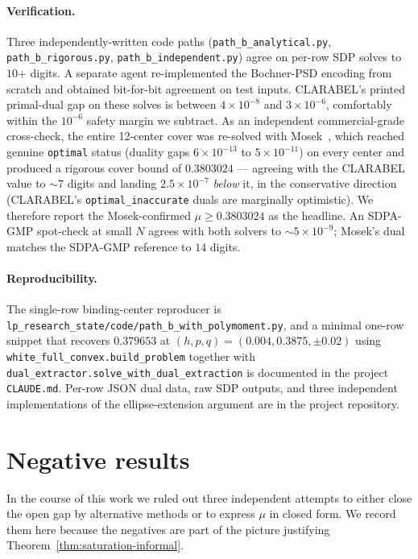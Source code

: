 \documentclass[11pt]{article}
\theoremstyle{plain}
\theoremstyle{definition}
\begin{document}
\paragraph{Verification.}
Three independently-written code paths (\texttt{path\_b\_analytical.py},
\texttt{path\_b\_rigorous.py}, \texttt{path\_b\_independent.py}) agree
on per-row SDP solves to $10$+ digits. A separate agent re-implemented
the Bochner-PSD encoding from scratch and obtained bit-for-bit
agreement on test inputs. CLARABEL's printed primal-dual gap on these
solves is between $4 \times 10^{-8}$ and $3 \times 10^{-6}$,
comfortably within the $10^{-6}$ safety margin we subtract. As an
independent commercial-grade cross-check, the entire 12-center cover
was re-solved with Mosek~\cite{MOSEK}, which reached genuine
\texttt{optimal} status (duality gaps $6 \times 10^{-13}$ to $5 \times
10^{-11}$) on every center and produced a rigorous cover bound of
$0.3803024$ --- agreeing with the CLARABEL value to $\sim 7$ digits and
landing $2.5 \times 10^{-7}$ \emph{below} it, in the conservative
direction (CLARABEL's \texttt{optimal\_inaccurate} duals are marginally
optimistic). We therefore report the Mosek-confirmed
$\mu \ge 0.3803024$ as the headline. An SDPA-GMP \cite{SDPA} spot-check
at small $N$ agrees with both solvers to $\sim 5 \times 10^{-9}$;
Mosek's dual matches the SDPA-GMP reference to $14$ digits.

\paragraph{Reproducibility.}
The single-row binding-center reproducer is
\texttt{lp\_research\_state/code/path\_b\_with\_polymoment.py}, and a
minimal one-row snippet that recovers $0.379653$ at
$(h, p, q) = (0.004, 0.3875, \pm 0.02)$ using
\texttt{white\_full\_convex.build\_problem} together with
\texttt{dual\_extractor.solve\_with\_dual\_extraction} is documented in
the project \texttt{CLAUDE.md}. Per-row JSON dual data, raw SDP outputs,
and three independent implementations of the ellipse-extension
argument are in the project repository.

\section{Negative results}\label{sec:negatives}

In the course of this work we ruled out three independent attempts to
either close the open gap by alternative methods or to express $\mu$
in closed form. We record them here because the negatives are part of
the picture justifying Theorem~\ref{thm:saturation-informal}.
\end{document}
